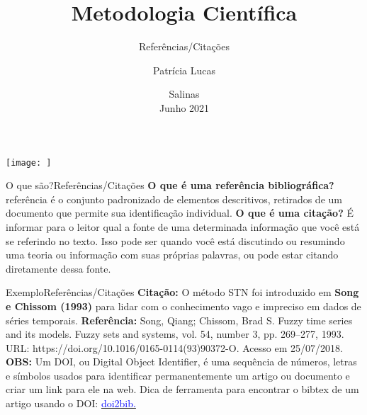 \documentclass[t]{beamer}
\title[]{Metodologia Científica}
\subtitle[]{Referências/Citações}
\author[]{Patrícia Lucas\\{\footnotesize }}
\institute{Bacharelado em Sistemas de Informação \\ IFNMG  - Campus Salinas}
\date{\scriptsize Salinas\\Junho 2021}
\begin{document}
\begin{frame}

\begin{center}
\texttt{[image: ]}
\end{center}
  \titlepage
\end{frame}



\begin{ftst}{O que são?}{Referências/Citações}
\justifying
\textbf{O que é uma referência bibliográfica?} referência é o conjunto padronizado de elementos descritivos, retirados de um documento que permite sua identificação individual.
\vone
\textbf{O que é uma citação?} É informar para o leitor qual a fonte de uma determinada informação que você está se referindo no texto. Isso pode ser quando você está discutindo ou resumindo uma teoria ou informação com suas próprias palavras, ou pode estar citando diretamente dessa fonte.

\end{ftst}


\begin{ftst}{Exemplo}{Referências/Citações}
\justifying
\vone
\textbf{Citação:} O método STN foi introduzido em \textbf{Song e Chissom (1993) }para lidar com o conhecimento vago e impreciso em dados de séries temporais.
\vone
\textbf{Referência:} Song, Qiang; Chissom, Brad S. Fuzzy time series and its models. Fuzzy sets and systems, vol. 54, number 3, pp. 269–277, 1993. URL: https://doi.org/10.1016/0165-0114(93)90372-O. Acesso em 25/07/2018.
\vone
\vone
\vone
\small
\textbf{OBS:} Um DOI, ou Digital Object Identifier, é uma sequência de números, letras e símbolos usados para identificar permanentemente um artigo ou documento e criar um link para ele na web.
\vone
Dica de ferramenta para encontrar o bibtex de um artigo usando o DOI: \href{https://www.doi2bib.org/}{\textcolor{blue}{doi2bib.}}
\end{ftst}
\end{document}
